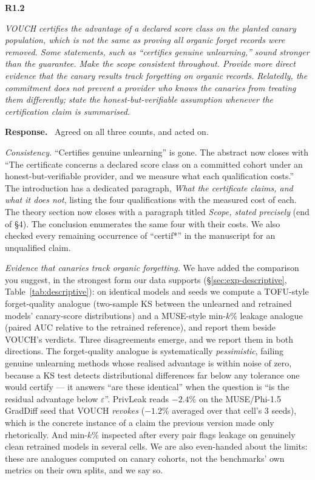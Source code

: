\documentclass[11pt,a4paper]{article}
\newcommand{\eps}{\varepsilon}
\newenvironment{point}[1]{%
  \par\medskip\noindent\textbf{\color{rcol}#1}\par\nopagebreak\smallskip\begingroup
  \color{rcol}\itshape}{\endgroup\par}
\newenvironment{reply}{%
  \par\smallskip\noindent\textbf{\color{acol}Response.}\ \begingroup}{\endgroup\par}
\begin{document}
\begin{point}{R1.2}
VOUCH certifies the advantage of a declared score class on the planted canary
population, which is not the same as proving all organic forget records were removed.
Some statements, such as ``certifies genuine unlearning,'' sound stronger than the
guarantee. Make the scope consistent throughout. Provide more direct evidence that the
canary results track forgetting on organic records. Relatedly, the commitment does not
prevent a provider who knows the canaries from treating them differently; state the
honest-but-verifiable assumption whenever the certification claim is summarised.
\end{point}

\begin{reply}
Agreed on all three counts, and acted on.

\emph{Consistency.} ``Certifies genuine unlearning'' is gone. The abstract now closes
with ``The certificate concerns a declared score class on a committed cohort under an
honest-but-verifiable provider, and we measure what each qualification costs.'' The
introduction has a dedicated paragraph, \emph{What the certificate claims, and what it
does not}, listing the four qualifications with the measured cost of each. The theory
section now closes with a paragraph titled \emph{Scope, stated precisely} (end of \S4). The conclusion enumerates the same four with
their costs. We also checked every remaining occurrence of ``certif*'' in the
manuscript for an unqualified claim.

\emph{Evidence that canaries track organic forgetting.} We have added the comparison
you suggest, in the strongest form our data supports (\S\ref{sec:exp-descriptive}, Table~\ref{tab:descriptive}): on identical
models and seeds we compute a TOFU-style forget-quality analogue (two-sample KS between
the unlearned and retrained models' canary-score distributions) and a MUSE-style
min-$k\%$ leakage analogue (paired AUC relative to the retrained reference), and report
them beside VOUCH's verdicts. Three disagreements emerge, and we report them in both
directions. The forget-quality analogue is systematically \emph{pessimistic},
failing genuine unlearning methods whose realised advantage is within noise of zero,
because a KS test detects distributional differences far below any tolerance one would
certify --- it answers ``are these identical'' when the question is ``is the residual
advantage below $\eps$''. PrivLeak reads $-2.4\%$ on the MUSE/Phi-1.5 GradDiff seed
that VOUCH \emph{revokes} ($-1.2\%$ averaged over that cell's $3$ seeds), which is the concrete instance of a claim the previous
version made only rhetorically. And min-$k\%$ inspected after every pair flags leakage
on genuinely clean retrained models in several cells. We are also even-handed about
the limits: these are analogues computed on canary cohorts, not the benchmarks' own
metrics on their own splits, and we say so.


\end{reply}
\end{document}
